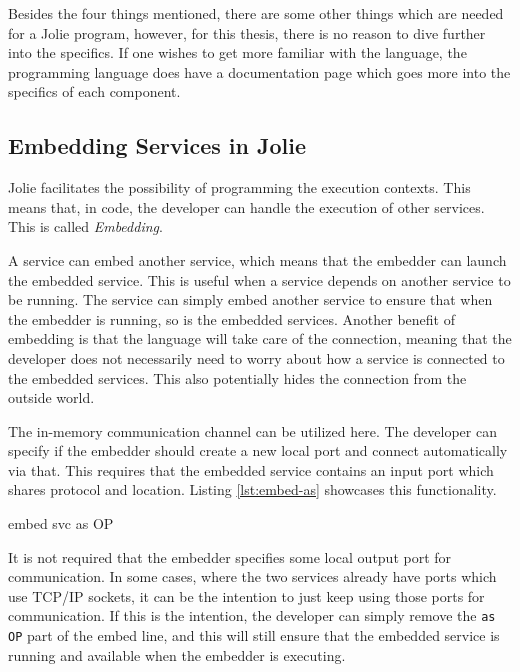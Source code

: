 Besides the four things mentioned, there are some other things which are needed for a Jolie program, however, for this thesis, there is no reason to dive further into the specifics.
If one wishes to get more familiar with the language, the programming language does have a documentation page which goes more into the specifics of each component.

\subsection{Embedding Services in Jolie}
Jolie facilitates the possibility of programming the execution contexts.
This means that, in code, the developer can handle the execution of other services. This is called \textit{Embedding}.

A service can embed another service, which means that the embedder can launch the embedded service. This is useful when a service depends on another service to be running.
The service can simply embed another service to ensure that when the embedder is running, so is the embedded services.
Another benefit of embedding is that the language will take care of the connection, meaning that the developer does not necessarily need to worry about how a service is connected to the embedded services.
This also potentially hides the connection from the outside world.

The in-memory communication channel can be utilized here. The developer can specify if the embedder should create a new local port and connect automatically via that. This requires that the embedded service contains an input port which shares protocol and location.
Listing \ref*{lst:embed-as} showcases this functionality.

\begin{jolisting}[][caption={Embedding of a service called "svc" via a local output port "OP"}, label=lst:embed-as]
embed svc as OP
\end{jolisting}

It is not required that the embedder specifies some local output port for communication. In some cases, where the two services already have ports which use TCP/IP sockets,
it can be the intention to just keep using those ports for communication. If this
is the intention, the developer can simply remove the \texttt{as OP} part of the embed line, and this will still ensure that the embedded service is running and available when the embedder is executing.

